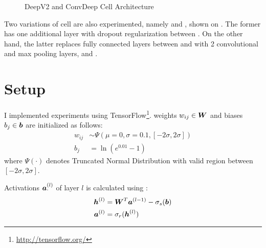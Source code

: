 \begin{figure}[!htb]
\centering

     \hfill

\caption{DeepV2 and ConvDeep Cell Architecture}
\label{fig:deep_conv_arch}
\end{figure}
%
%
%
%
%

Two variations of  cell are also experimented, namely  and , shown on \addfigure{\ref{fig:deep_conv_arch}}. The former has one additional layer  with dropout regularization  between . On the other hand, the latter replaces fully connected layers between  and  with 2 convolutional and max pooling layers,  and .




\section{Setup}\label{sec:setup}
 
 I implemented experiments using TensorFlow\footnote{\url{http://tensorflow.org/}}.  weights $w_{ij} \in \patmatrix{W}$ and biases $b_{j} \in \patvector{b}$ are initialized as follows:
\begin{align*}
	w_{ij} &\sim \Psi( \mu=0, \sigma =0.1, [-2\sigma, 2\sigma]) \\
	b_{j} &= \ln(e^{0.01} - 1)
\end{align*}
where $\Psi(\cdot)$ denotes Truncated Normal Distribution with valid region between $[-2\sigma, 2\sigma]$.


Activations $\patvector{a}^{(l)}_\cdot$ of layer $l$ is calculated using :
\begin{align*}
	\patvector{h}^{(l)}  &=  	\patmatrix{W}^T \patvector{a}^{(l-1)} - \sigma_{s}(\patvector{b}) \\
	\patvector{a}^{(l)}  &=  	\sigma_{r} (	\patvector{h}^{(l)} )
\end{align*}

